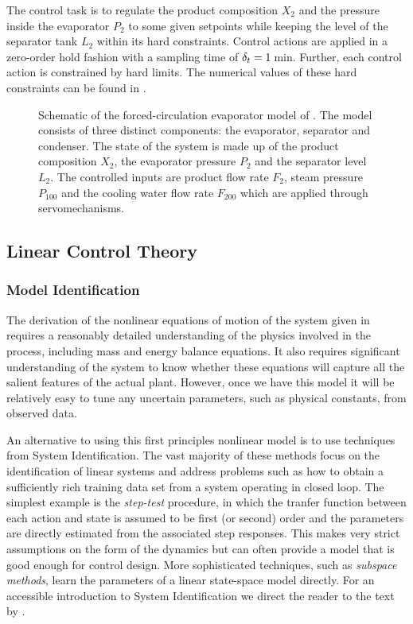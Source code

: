 The control task is to regulate the product composition $X_2$ and the pressure inside the evaporator $P_2$ to some given setpoints while keeping the level of the separator tank $L_2$ within its hard constraints. Control actions are applied in a zero-order hold fashion with a sampling time of $\delta_t = 1\,$min. Further, each control action is constrained by hard limits. The numerical values of these hard constraints can be found in .



\begin{figure}
\centering

\caption{\small Schematic of the forced-circulation evaporator model of \cite{NeLe89}. The model consists of three distinct components: the evaporator, separator and condenser. The state of the system is made up of the product composition $X_2$, the evaporator pressure $P_2$ and the separator level $L_2$. The controlled inputs are product flow rate $F_2$, steam pressure $P_{100}$ and the cooling water flow rate $F_{200}$ which are applied through servomechanisms.}
\label{fig:evap}
\end{figure}



\subsection{Linear Control Theory}
\subsubsection{Model Identification}
The derivation of the nonlinear equations of motion of the system given in  requires a reasonably detailed understanding of the physics involved in the process, including mass and energy balance equations. It also requires significant understanding of the system to know whether these equations will capture all the salient features of the actual plant. However, once we have this model it will be relatively easy to tune any uncertain parameters, such as physical constants, from observed data.


An alternative to using this first principles nonlinear model is to use techniques from System Identification. The vast majority of these methods focus on the identification of linear systems and address problems such as how to obtain a sufficiently rich training data set from a system operating in closed loop. The simplest example is the \textit{step-test} procedure, in which the tranfer function between each action and state is assumed to be first (or second) order and the parameters are directly estimated from the associated step responses. This makes very strict assumptions on the form of the dynamics but can often provide a model that is good enough for control design. More sophisticated techniques, such as \textit{subspace methods}, learn the parameters of a linear state-space model directly. For an accessible introduction to System Identification we direct the reader to the text by \cite{Lju99}.
 

